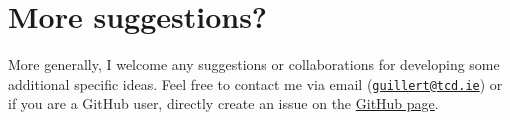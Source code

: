 \documentclass[]{book}
\theoremstyle{definition}
\theoremstyle{definition}
\theoremstyle{remark}
\begin{document}
\section{More suggestions?}\label{more-suggestions}

More generally, I welcome any suggestions or collaborations for
developing some additional specific ideas. Feel free to contact me via
email (\href{mailto:guillert@tcd.ie}{\nolinkurl{guillert@tcd.ie}}) or if
you are a GitHub user, directly create an issue on the
\href{https://github.com/TGuillerme/dispRity}{GitHub page}.


\end{document}
